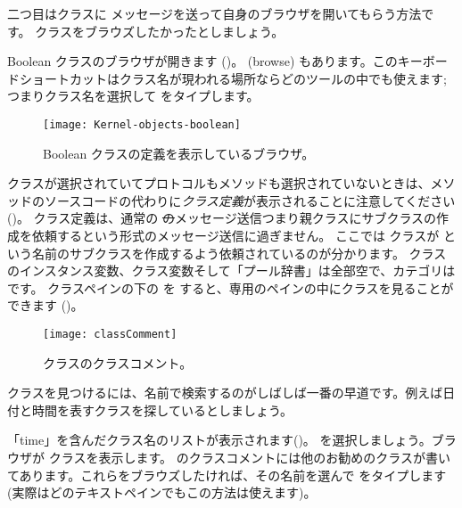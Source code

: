 \documentclass[a4paper,10pt,twoside]{book}
\begin{document}
二つ目はクラスに  メッセージを送って自身のブラウザを開いてもらう方法です。 クラスをブラウズしたかったとしましょう。

Boolean クラスのブラウザが開きます ()。
  (browse) もあります。このキーボードショートカットはクラス名が現われる場所ならどのツールの中でも使えます;
つまりクラス名を選択して  をタイプします。


\begin{figure}[hbt]
\centerline {\texttt{[image: Kernel-objects-boolean]}}
\caption{Boolean クラスの定義を表示しているブラウザ。
}
\end{figure}

 クラスが選択されていてプロトコルもメソッドも選択されていないときは、メソッドのソースコードの代わりに\emph{クラス定義}が表示されることに注意してください ()。
クラス定義は、通常の \st のメッセージ送信つまり親クラスにサブクラスの作成を依頼するという形式のメッセージ送信に過ぎません。
ここでは  クラスが  という名前のサブクラスを作成するよう依頼されているのが分かります。 クラスのインスタンス変数、クラス変数そして「プール辞書」は全部空で、カテゴリは です。
クラスペインの下の  を \click すると、専用のペインの中にクラスを見ることができます ()。

\begin{figure}[hbt]
\centerline {\texttt{[image: classComment]}}
\caption{ クラスのクラスコメント。
}
\end{figure}

クラスを見つけるには、名前で検索するのがしばしば一番の早道です。例えば日付と時間を表すクラスを探しているとしましょう。

\noindent
「time」を含んだクラス名のリストが表示されます()。 を選択しましょう。ブラウザが  クラスを表示します。 のクラスコメントには他のお勧めのクラスが書いてあります。これらをブラウズしたければ、その名前を選んで  をタイプします(実際はどのテキストペインでもこの方法は使えます)。
\end{document}
